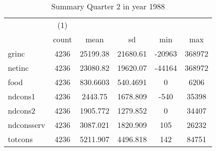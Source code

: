 \begin{table}[htbp]\centering
\def\sym#1{\ifmmode^{#1}\else\(^{#1}\)\fi}
\caption{Summary Quarter 2 in year 1988 \label{sum\_Q2\_y1988}}
\begin{tabular}{l*{1}{ccccc}}
\hline\hline
            &\multicolumn{1}{c}{(1)}&            &            &            &            \\
            &       count&        mean&          sd&         min&         max\\
\hline
grinc       &        4236&    25199.38&    21680.61&      -20963&      368972\\
netinc      &        4236&    23080.82&    19620.07&      -44164&      368972\\
food        &        4236&    830.6603&    540.4691&           0&        6206\\
ndcons1     &        4236&     2443.75&    1678.809&        -540&       35398\\
ndcons2     &        4236&    1905.772&    1279.852&           0&       34407\\
ndconsserv  &        4236&    3087.021&    1820.909&         105&       26232\\
totcons     &        4236&    5211.907&    4496.818&         142&       84751\\
\hline\hline
\end{tabular}
\end{table}
